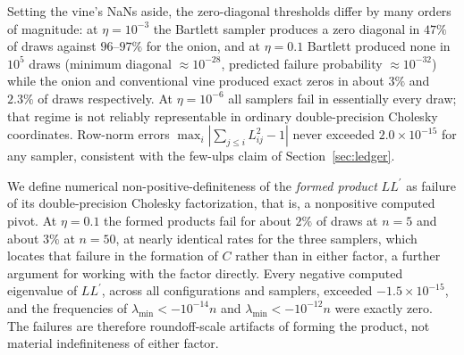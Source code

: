 \documentclass[12pt,english]{article}
\theoremstyle{plain} %
\theoremstyle{definition} %
\theoremstyle{remark} %
\newcommand{\xsec}[2]{Section~\ref{#1}}
\begin{document}
Setting the vine's NaNs aside, the zero-diagonal thresholds differ by many orders of magnitude: at $\eta=10^{-3}$ the Bartlett sampler produces a zero diagonal in $47\%$ of draws against $96$--$97\%$ for the onion, and at $\eta=0.1$ Bartlett produced none in $10^5$ draws (minimum diagonal $\approx10^{-28}$, predicted failure probability $\approx10^{-32}$) while the onion and conventional vine produced exact zeros in about $3\%$ and $2.3\%$ of draws respectively. At $\eta=10^{-6}$ all samplers fail in essentially every draw; that regime is not reliably representable in ordinary double-precision Cholesky coordinates. Row-norm errors $\max_i|\sum_{j\leq i}L_{ij}^2-1|$ never exceeded $2.0\times10^{-15}$ for any sampler, consistent with the few-ulps claim of \xsec{sec:ledger}{7}.

We define numerical non-positive-definiteness of the \emph{formed product} $LL^\prime$ as failure of its double-precision Cholesky factorization, that is, a nonpositive computed pivot. At $\eta=0.1$ the formed products fail for about $2\%$ of draws at $n=5$ and about $3\%$ at $n=50$, at nearly identical rates for the three samplers, which locates that failure in the formation of $C$ rather than in either factor, a further argument for working with the factor directly.
Every negative computed eigenvalue of $LL^\prime$, across all configurations and samplers, exceeded $-1.5\times10^{-15}$, and the frequencies of $\lambda_{\min}<-10^{-14}n$ and $\lambda_{\min}<-10^{-12}n$ were exactly zero. The failures are therefore roundoff-scale artifacts of forming the product, not material indefiniteness of either factor.
\end{document}
